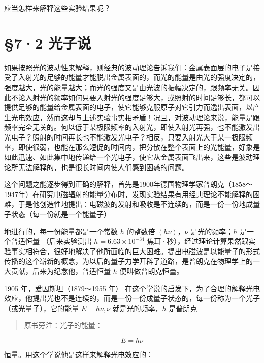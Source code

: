 应当怎样来解释这些实验结果呢？

\section{§7·2 光子说}

如果按照光的波动性来解释，则经典的波动理论告诉我们：金属表面层的电子是接受了入射光的足够的能量才能脱出金属表面的，而光的能量是由光的强度决定的，强度越大，光的能量越大；而光的强度又是由光波的振幅决定的，跟频率无关。因此不论入射光的频率如何只要入射光的强度足够大，或照射的时间足够长，都可以提供足够的能量给金属表面的电子，使它能够克服原子对它引力而逸出表面，以产生光电效应，然而这却与上述实验事实相矛盾！况且，对波动理论来说，能量是跟频率完全无关的。何以低于某极限频率的入射光，即使入射光再强，也不能激发出光电子？照射的时间再长也不能激发光电子？相反，只要入射光大于某一极限频率，即使很弱，也能在那么短促的时间内，把分散在整个表面上的光能量，好象是如此迅速、如此集中地传递给一个光电子，使它从金属表面飞出来，这些是波动理论所无法解释的，也是很长时间内使人们感到困惑的问题。

这个问题之能逐步得到正确的解释，首先是1900年德国物理学家普朗克（1858～1947年）在研究电磁辐射的能量分布时，发现实验结果有用经典理论不能解释的困难，于是他创造性地提出：电磁波的发射和吸收是不连续的，而是一份一份地成量子状态（每一份就是一个能量子）

地进行的，每一份能量都是一个常数 \(h\) 的整数倍 \((h\nu)\)，\(\nu\)
是光的频率；\(h\) 是一个普适恒量 （后来实验测出
\(h = 6.63 \times 10^{-34}\)
焦耳·秒），经过理论计算果然跟实验事实相符合，很好地解决了他所面临的巨大困难。提出电磁波是以能量子的形式传播的这个崭新的概念，为以后的量子力学开辟了道路，是普朗克在物理学上的一大贡献，后来为纪念他，普适恒量
\(h\) 便叫做普朗克恒量。

1905 年，爱因斯坦（1879～1955 年）
在这个学说的启发下，为了合理的解释光电效应，他提出光也不是连续的，而是一份一份成量子状态的，每一份称为一个光子（或光量子），它的能量
\(E = h\nu, \nu\) 就是光的频率，\(h\) 是普朗克

\begin{quote}
原书旁注：光子的能量：
\end{quote}

\[
E = h \nu
\]

恒量。用这个学说他是这样来解释光电效应的：

